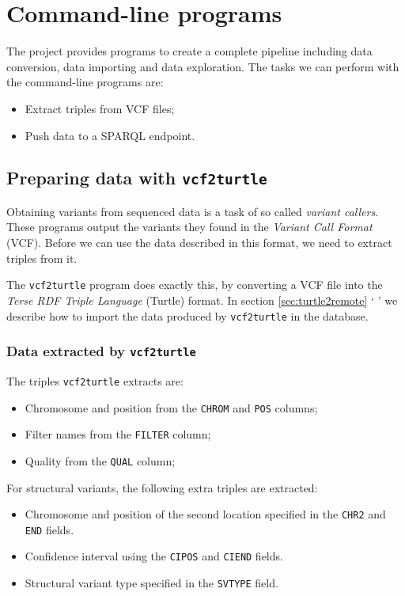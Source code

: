 \documentclass[11pt,a4paper,oneside]{book}
\begin{document}
\chapter{Command-line programs}

  The project provides programs to create a complete pipeline including
  data conversion, data importing and data exploration.  The tasks we can
  perform with the command-line programs are:
  \begin{itemize}
    \item Extract triples from VCF files;
    \item Push data to a SPARQL endpoint.
  \end{itemize}

\section{Preparing data with \texttt{vcf2turtle}}
\label{sec:vcf2turtle}

  Obtaining variants from sequenced data is a task of so called
  \emph{variant callers}.  These programs output the variants they found in
  the \emph{Variant Call Format} (VCF).  Before we can use the data described
  in this format, we need to extract triples from it.

  The \texttt{vcf2turtle} program does exactly this, by converting a VCF file
  into the \emph{Terse RDF Triple Language} (Turtle) format.  In section
  \ref{sec:turtle2remote} {\color{LinkGray}`%
  '} we describe how to import the data produced by
  \texttt{vcf2turtle} in the database.

\subsection{Data extracted by \texttt{vcf2turtle}}

  The triples \texttt{vcf2turtle} extracts are:
  \begin{itemize}
    \item Chromosome and position from the \texttt{CHROM} and \texttt{POS}
      columns;
    \item Filter names from the \texttt{FILTER} column;
    \item Quality from the \texttt{QUAL} column;
  \end{itemize}

  For structural variants, the following extra triples are extracted:
  \begin{itemize}
    \item Chromosome and position of the second location specified in the
      \texttt{CHR2} and \texttt{END} fields.
    \item Confidence interval using the \texttt{CIPOS} and \texttt{CIEND}
      fields.
    \item Structural variant type specified in the \texttt{SVTYPE} field.
  \end{itemize}
\end{document}
